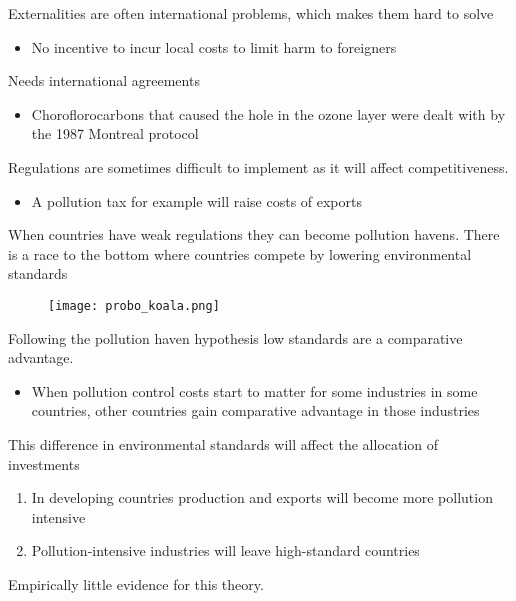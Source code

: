 \documentclass{beamer}
\begin{document}
\begin{frame}
  Externalities are often international problems, which makes them hard to solve
  \begin{itemize}
    \item No incentive to incur local costs to limit harm to foreigners
  \end{itemize}
  \medskip
  Needs international agreements
  \begin{itemize}
    \item Choroflorocarbons that caused the hole in the ozone layer were dealt with by the 1987 Montreal protocol
  \end{itemize}
\end{frame}

\begin{frame}
  Regulations are sometimes difficult to implement as it will affect competitiveness. 
  \begin{itemize}
    \item A pollution tax for example will raise costs of exports    
  \end{itemize}
  \medskip
  When countries have weak regulations they can become pollution havens.
  There is a race to the bottom where countries compete by lowering environmental standards
\end{frame}

\begin{frame}
  \begin{figure}
    \texttt{[image: probo\_koala.png]}
  \end{figure}
\end{frame}

\begin{frame}
  Following the pollution haven hypothesis low standards are a comparative advantage.
  \begin{itemize}
    \item When pollution control costs start to matter for some industries in some countries, other countries gain comparative advantage in those industries
  \end{itemize}
  \medskip
  This difference in environmental standards will affect the allocation of investments
  \begin{enumerate}
    \item In developing countries production and exports will become more pollution intensive
    \item Pollution-intensive industries will leave high-standard countries
  \end{enumerate}
  \medskip
  Empirically little evidence for this theory.
\end{frame}
\end{document}
